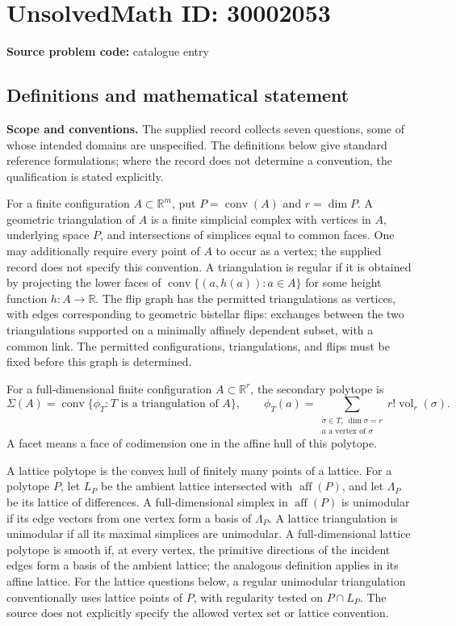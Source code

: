 \documentclass[11pt]{article}
\newcommand{\R}{\mathbb{R}}
\begin{document}
\section*{UnsolvedMath ID: 30002053}
\textbf{Source problem code:} catalogue entry
\subsection{Definitions and mathematical statement}
\textbf{Scope and conventions.} The supplied record collects seven questions, some of whose intended domains are unspecified. The definitions below give standard reference formulations; where the record does not determine a convention, the qualification is stated explicitly.

For a finite configuration \(A\subset\R^m\), put \(P=\operatorname{conv}(A)\) and \(r=\dim P\). A geometric triangulation of \(A\) is a finite simplicial complex with vertices in \(A\), underlying space \(P\), and intersections of simplices equal to common faces. One may additionally require every point of \(A\) to occur as a vertex; the supplied record does not specify this convention. A triangulation is regular if it is obtained by projecting the lower faces of \(\operatorname{conv}\{(a,h(a)):a\in A\}\) for some height function \(h:A\to\R\). The flip graph has the permitted triangulations as vertices, with edges corresponding to geometric bistellar flips: exchanges between the two triangulations supported on a minimally affinely dependent subset, with a common link. The permitted configurations, triangulations, and flips must be fixed before this graph is determined.

For a full-dimensional finite configuration \(A\subset\R^r\), the secondary polytope is
\[
 \Sigma(A)=\operatorname{conv}\{\phi_T:T\text{ is a triangulation of }A\},\qquad
 \phi_T(a)=\sum_{\substack{\sigma\in T,\ \dim\sigma=r\\a\text{ a vertex of }\sigma}}r!\operatorname{vol}_r(\sigma).
\]
A facet means a face of codimension one in the affine hull of this polytope.

A lattice polytope is the convex hull of finitely many points of a lattice. For a polytope \(P\), let \(L_P\) be the ambient lattice intersected with \(\operatorname{aff}(P)\), and let \(\Lambda_P\) be its lattice of differences. A full-dimensional simplex in \(\operatorname{aff}(P)\) is unimodular if its edge vectors from one vertex form a basis of \(\Lambda_P\). A lattice triangulation is unimodular if all its maximal simplices are unimodular. A full-dimensional lattice polytope is smooth if, at every vertex, the primitive directions of the incident edges form a basis of the ambient lattice; the analogous definition applies in its affine lattice. For the lattice questions below, a regular unimodular triangulation conventionally uses lattice points of \(P\), with regularity tested on \(P\cap L_P\). The source does not explicitly specify the allowed vertex set or lattice convention.
\end{document}
